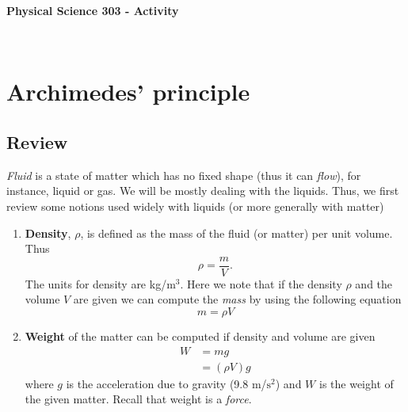 \documentclass[10pt]{article}
\date{2014-6-22}
\begin{document}
\begin{center}
\begin{Large}\textbf{Physical Science 303 - Activity}\end{Large} \\
\smallskip
\end{center}

\section{Archimedes' principle}
\subsection{Review}
\emph{Fluid} is a state of matter which has no fixed shape (thus it can \emph{flow}), for instance, liquid or gas.  We will be mostly dealing with the liquids.  Thus, we first review some notions used widely with liquids (or more generally with matter)
\begin{enumerate}
\item \textbf{Density}, $\rho$, is defined as the mass of the fluid (or matter) per unit volume.  Thus
  \begin{equation}
    \rho = \frac{m}{V}.
  \end{equation}
The units for density are kg/$\text{m}^3$.
Here we note that if the density $\rho$ and the volume $V$ are given we can compute the \emph{mass} by using the following equation
\begin{equation}
  m = \rho V
\end{equation}
\item \textbf{Weight} of the matter can be computed if density and volume are given 
  \begin{equation}
    \label{weigheq}
    \begin{split}
      W &= mg\\
      &= (\rho V)g
    \end{split}
  \end{equation}
where $g$ is the acceleration due to gravity (9.8 m/$\text{s}^2$) and $W$ is the weight of the given matter.  Recall that weight is a \emph{force}.
\end{enumerate}
\end{document}
